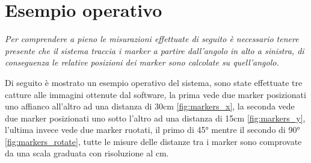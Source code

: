 \documentclass[12pt,a4paper,openright,twoside]{book}
\begin{document}
\section{Esempio operativo} \label{sec:esempio_operativo}
\textit{Per comprendere a pieno le misurazioni effettuate di seguito è necessario tenere presente che il sistema traccia i marker a partire dall'angolo in alto a sinistra, di conseguenza le relative posizioni dei marker sono calcolate su quell'angolo.}
\vspace{0.5cm}

Di seguito è mostrato un esempio operativo del sistema, sono state effettuate tre catture alle immagini ottenute dal software, la prima vede due marker posizionati uno affianco all'altro ad una distanza di 30cm \ref{fig:markers_x}, la seconda vede due marker posizionati uno sotto l'altro ad una distanza di 15cm \ref{fig:markers_y}, l'ultima invece vede due marker ruotati, il primo di 45° mentre il secondo di 90° \ref{fig:markers_rotate}, tutte le misure delle distanze tra i marker sono comprovate da una scala graduata con risoluzione al cm. 
\end{document}
